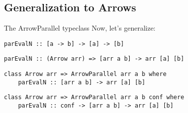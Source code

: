 \subsection{Generalization to Arrows}


\begin{frame}[fragile]{The ArrowParallel typeclass}
Now, let's generalize:
\begin{lstlisting}[frame=htrbl]
parEvalN :: [a -> b] -> [a] -> [b]
\end{lstlisting}
\pause
\begin{lstlisting}[frame=htrbl]
parEvalN :: (Arrow arr) => [arr a b] -> arr [a] [b]
\end{lstlisting}
\pause
\begin{lstlisting}[frame=htrbl]
class Arrow arr => ArrowParallel arr a b where
	parEvalN :: [arr a b] -> arr [a] [b]
\end{lstlisting}
\pause
\begin{lstlisting}[frame=htrbl]
class Arrow arr => ArrowParallel arr a b conf where
	parEvalN :: conf -> [arr a b] -> arr [a] [b]
\end{lstlisting}

\end{frame}
